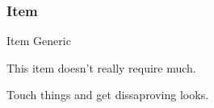 \documentclass[10pt,twoside,twocolumn]{article}
\begin{document}
\subsubsection{Item}

\begin{itembox}{Item Generic}
    \itemdetails[]
    \begin{itemaction}[Materials]
    This item doesn't really require much.
    \end{itemaction}

    \begin{itemaction}[Effect]
    Touch things and get dissaproving looks.
    \end{itemaction}
\end{itembox}

\end{document}
